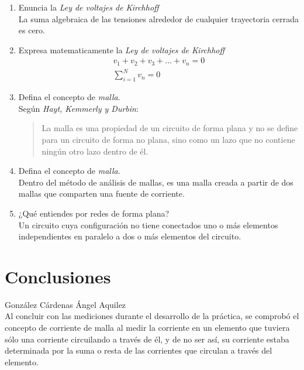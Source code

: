 \documentclass[a4paper,12pt]{article}
\begin{document}
\begin{enumerate}

\item Enuncia la \emph{Ley de voltajes de Kirchhoff} \\ La suma algebraica de las tensiones alrededor de cualquier trayectoria cerrada es cero.

\item Expresa matematicamente la \emph{Ley de voltajes de Kirchhoff} \\

\begin{align*}
	v_1 + v_2 + v_3 + ... + v_n = 0 \\
	\sum\limits_{i=1}^N v_n = 0
\end{align*}

\item Defina el concepto de \emph{malla}. \\ Según \textit{Hayt, Kemmerly y Durbin}:\\
\begin{quotation}
	La malla es una propiedad de un circuito de forma plana y no se define para un circuito de forma no plana, sino como un lazo que no contiene ningún otro lazo dentro de él.
\end{quotation}

\item Defina el concepto de \emph{malla}. \\ Dentro del método de análisis de mallas, es una malla creada a partir de dos mallas que comparten una fuente de corriente.

\item ¿Qué entiendes por redes de forma plana? \\ Un circuito cuya configuración no tiene conectados uno o más elementos independientes en paralelo a dos o más elementos del circuito.

\end{enumerate}

\newpage

\section{Conclusiones}

\vspace{.5cm}

{\Large González Cárdenas Ángel Aquilez}\\
\vspace{.3cm}
Al concluir con las mediciones durante el desarrollo de la práctica, se comprobó el concepto de corriente de malla al medir la corriente en un elemento que tuviera sólo una corriente circuilando a través de él, y de no ser así, su corriente estaba determinada por la suma o resta de las corrientes que circulan a través del elemento.\par
\end{document}
